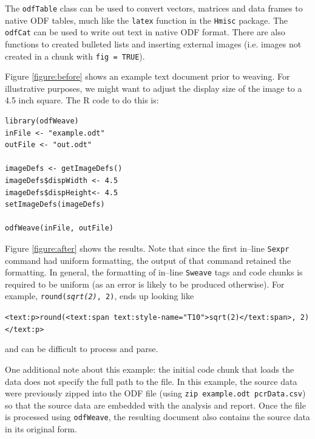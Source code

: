 \documentclass[12pt]{article}
\begin{document}
The \texttt{odfTable} class can be used to convert vectors, matrices and data frames to native ODF tables, much like the \texttt{latex} function in the \texttt{Hmisc} package. The \texttt{odfCat} can be used to write out text in native ODF format. There are also functions to created bulleted lists and inserting external images (i.e. images not created in a chunk with \texttt{fig = TRUE}). 

Figure \ref{figure:before} shows an example text document prior to weaving. For illustrative purposes, we might want to adjust the display size of the image to a 4.5 inch square. The R code to do this is:
\begin{verbatim}
library(odfWeave)
inFile <- "example.odt"
outFile <- "out.odt"

imageDefs <- getImageDefs()
imageDefs$dispWidth <- 4.5
imageDefs$dispHeight<- 4.5
setImageDefs(imageDefs)

odfWeave(inFile, outFile)
\end{verbatim}
Figure \ref{figure:after} shows the results. Note that since the first in--line \texttt{Sexpr} command had uniform formatting, the output of that command retained the formatting. In general, the formatting of in--line \texttt{Sweave} tags and code chunks is required to be uniform (as an error is likely to be produced otherwise). For example,  \texttt{round({\it sqrt(2)}, 2)}, ends up looking like
      
      {\center \small \verb+<text:p>round(<text:span text:style-name="T10">sqrt(2)</text:span>, 2)</text:p>+}
      
\noindent and can be difficult to process and parse.

One additional note about this example: the initial code chunk that loads the data does not specify the full path to the file. In this example, the source data were previously zipped into the ODF file (using \texttt{zip example.odt pcrData.csv}) so that the source data are embedded with the analysis and report. Once the file is processed using \texttt{odfWeave}, the resulting document also contains the source data in its original form. 
\end{document}
